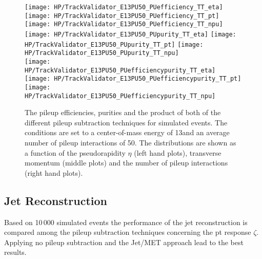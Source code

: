 \begin{figure}[!h]
  \centering
  \texttt{[image: HP/TrackValidator\_E13PU50\_PUefficiency\_TT\_eta]}
  \texttt{[image: HP/TrackValidator\_E13PU50\_PUefficiency\_TT\_pt]}
  \texttt{[image: HP/TrackValidator\_E13PU50\_PUefficiency\_TT\_npu]}
   \\
  \texttt{[image: HP/TrackValidator\_E13PU50\_PUpurity\_TT\_eta]}
  \texttt{[image: HP/TrackValidator\_E13PU50\_PUpurity\_TT\_pt]}
  \texttt{[image: HP/TrackValidator\_E13PU50\_PUpurity\_TT\_npu]}
   \\
  \texttt{[image: HP/TrackValidator\_E13PU50\_PUefficiencypurity\_TT\_eta]}
  \texttt{[image: HP/TrackValidator\_E13PU50\_PUefficiencypurity\_TT\_pt]}
  \texttt{[image: HP/TrackValidator\_E13PU50\_PUefficiencypurity\_TT\_npu]}
  \caption[Pileup efficiencies, purities and their product of the different pileup subtraction techniques for simulated \ttbar events with 13\TeV and PU=50]{The pileup efficiencies, purities and the product of both of the different pileup subtraction techniques for simulated \ttbar events. The conditions are set to a center-of-mass energy of 13\TeV and an average number of pileup interactions of 50. The distributions are shown as a function of the pseudorapidity $\eta$ (left hand plots), transverse momentum (middle plots) and the number of pileup interactions (right hand plots).}
\end{figure}
\clearpage

\subsection{Jet Reconstruction \label{sec:HPUAppE13PU50JR}}

Based on 10\,000 simulated \ttbar events the performance of the jet reconstruction is compared among the pileup subtraction techniques concerning the pt response $\zeta$. Applying no pileup subtraction and the Jet/MET approach lead to the best results. 

